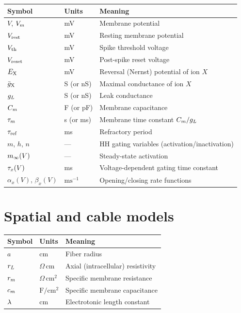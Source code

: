 \begin{tabular}{@{}lll@{}}
  \toprule
  \textbf{Symbol} & \textbf{Units} & \textbf{Meaning} \\
  \midrule
  $V$, $V_m$ & mV & Membrane potential \\
  $V_{\text{rest}}$ & mV & Resting membrane potential \\
  $V_{\text{th}}$ & mV & Spike threshold voltage \\
  $V_{\text{reset}}$ & mV & Post-spike reset voltage \\
  $E_{\mathrm{X}}$ & mV & Reversal (Nernst) potential of ion $X$ \\
  $\bar{g}_{\mathrm{X}}$ & S (or nS) & Maximal conductance of ion $X$ \\
  $g_L$ & S (or nS) & Leak conductance \\
  $C_m$ & F (or pF) & Membrane capacitance \\
  $\tau_m$ & s (or ms) & Membrane time constant $C_m / g_L$ \\
  $\tau_{\text{ref}}$ & ms & Refractory period \\
  $m$, $h$, $n$ & --- & HH gating variables (activation/inactivation) \\
  $m_\infty(V)$ & --- & Steady-state activation \\
  $\tau_x(V)$ & ms & Voltage-dependent gating time constant \\
  $\alpha_x(V)$, $\beta_x(V)$ & $\text{ms}^{-1}$ & Opening/closing rate functions \\
  \bottomrule
\end{tabular}

\section*{Spatial and cable models}

\begin{tabular}{@{}lll@{}}
  \toprule
  \textbf{Symbol} & \textbf{Units} & \textbf{Meaning} \\
  \midrule
  $a$ & cm & Fiber radius \\
  $r_L$ & $\Omega\,\text{cm}$ & Axial (intracellular) resistivity \\
  $r_m$ & $\Omega\,\text{cm}^2$ & Specific membrane resistance \\
  $c_m$ & $\text{F}/\text{cm}^2$ & Specific membrane capacitance \\
  $\lambda$ & cm & Electrotonic length constant \\
  \bottomrule
\end{tabular}

